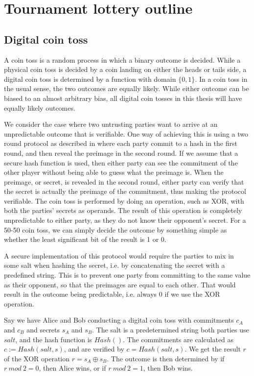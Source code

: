 \section{Tournament lottery outline}
\label{sec:outline}

\subsection{Digital coin toss}

A coin toss is a random process in which a binary outcome is decided. While a physical coin toss is decided by a coin landing on either the heads or tails side, a digital coin toss is determined by a function with domain $\{0, 1\}$. In a coin toss in the usual sense, the two outcomes are equally likely. While either outcome can be biased to an almost arbitrary bias, all digital coin tosses in this thesis will have equally likely outcomes.

We consider the case where two untrusting parties want to arrive at an unpredictable outcome that is verifiable. One way of achieving this is using a two round protocol as described in \cite{blum1983coin} where each party commit to a hash in the first round, and then reveal the preimage in the second round. If we assume that a secure hash function is used, then either party can see the commitment of the other player without being able to guess what the preimage is. When the preimage, or secret, is revealed in the second round, either party can verify that the secret is actually the preimage of the commitment, thus making the protocol verifiable. The coin toss is performed by doing an operation, such as XOR, with both the parties' secrets as operands. The result of this operation is completely unpredictable to either party, as they do not know their opponent's secret. For a 50-50 coin toss, we can simply decide the outcome by something simple as whether the least significant bit of the result is 1 or 0.

A secure implementation of this protocol would require the parties to mix in some salt when hashing the secret, i.e. by concatenating the secret with a predefined string. This is to prevent one party from committing to the same value as their opponent, so that the preimages are equal to each other. That would result in the outcome being predictable, i.e. always $0$ if we use the XOR operation. 

Say we have Alice and Bob conducting a digital coin toss with commitments $c_A$ and $c_B$ and secrets $s_A$ and $s_B$. The salt is a predetermined string both parties use $salt$, and the hash function is $Hash()$. The commitments are calculated as $c:=Hash(salt, s)$, and are verified by $c=Hash(salt, s)$. We get the result $r$ of the XOR operation $r=s_A \oplus s_B$. The outcome is then determined by if $r\ mod\ 2 = 0$, then Alice wins, or if $r\ mod\ 2 = 1$, then Bob wins.

